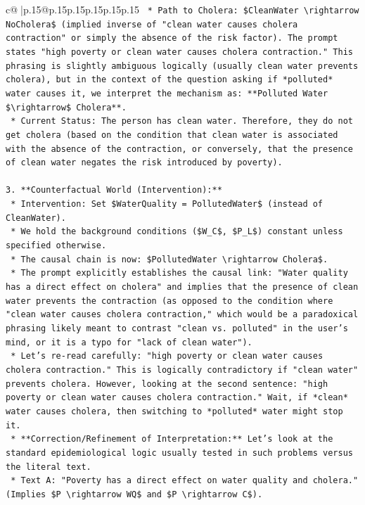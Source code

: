 \documentclass{article}
\begin{document}
{\begin{supertabular}{c@{$\;$}|p{.15\linewidth}@{}p{.15\linewidth}p{.15\linewidth}p{.15\linewidth}p{.15\linewidth}p{.15\linewidth}}
{{{\texttt{    *   Path to Cholera: \$CleanWater \textbackslash{}rightarrow NoCholera\$ (implied inverse of "clean water causes cholera contraction" or simply the absence of the risk factor). The prompt states "high poverty or clean water causes cholera contraction." This phrasing is slightly ambiguous logically (usually clean water prevents cholera), but in the context of the question asking if *polluted* water causes it, we interpret the mechanism as: **Polluted Water \$\textbackslash{}rightarrow\$ Cholera**.} \\
\texttt{    *   Current Status: The person has clean water. Therefore, they do not get cholera (based on the condition that clean water is associated with the absence of the contraction, or conversely, that the presence of clean water negates the risk introduced by poverty).} \\
\\ 
\texttt{3.  **Counterfactual World (Intervention):**} \\
\texttt{    *   Intervention: Set \$WaterQuality = PollutedWater\$ (instead of CleanWater).} \\
\texttt{    *   We hold the background conditions (\$W\_C\$, \$P\_L\$) constant unless specified otherwise.} \\
\texttt{    *   The causal chain is now: \$PollutedWater \textbackslash{}rightarrow Cholera\$.} \\
\texttt{    *   The prompt explicitly establishes the causal link: "Water quality has a direct effect on cholera" and implies that the presence of clean water prevents the contraction (as opposed to the condition where "clean water causes cholera contraction," which would be a paradoxical phrasing likely meant to contrast "clean vs. polluted" in the user's mind, or it is a typo for "lack of clean water").} \\
\texttt{    *   Let's re{-}read carefully: "high poverty or clean water causes cholera contraction." This is logically contradictory if "clean water" prevents cholera. However, looking at the second sentence: "high poverty or clean water causes cholera contraction." Wait, if *clean* water causes cholera, then switching to *polluted* water might stop it.} \\
\texttt{    *   **Correction/Refinement of Interpretation:** Let's look at the standard epidemiological logic usually tested in such problems versus the literal text.} \\
\texttt{        *   Text A: "Poverty has a direct effect on water quality and cholera." (Implies \$P \textbackslash{}rightarrow WQ\$ and \$P \textbackslash{}rightarrow C\$).} \\
}}}
\end{supertabular}}
\end{document}
